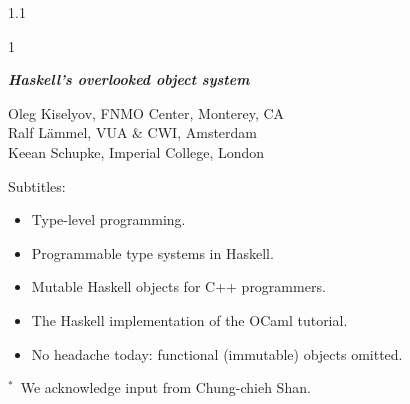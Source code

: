 \documentclass{slides}
\newenvironment{myslide}{\begin{slide}\color{Blue}\begin{boxedminipage}{1.1\hsize}\begin{boxedminipage}{1\hsize}\color{Black}
\vspace{-170\in}
}{%
\smallskip
\end{boxedminipage}
\end{boxedminipage}
\end{slide}}
\newenvironment{myslide}{\begin{slide}
}{%
\end{slide}}
\newenvironment{myslide}{\begin{slide}\color{White}\begin{boxedminipage}{1.1\hsize}\color{Black}
\vspace{-170\in}
}{%
\smallskip
\end{boxedminipage}
\end{slide}}
\newcommand{\noskip}{\topsep1pt \parskip1pt \partopsep1pt}
\newcommand{\header}[1]{{\large \color{Red} #1}}
\newcommand{\blau}[1]{{\vspace{-50\in}\normalsize \color{Blue} #1}}
\begin{document}
\pagestyle{empty}



\begin{comment}
\begin{slide}
 
Press PgDn to start.
 
\end{slide}
\end{comment}






\begin{myslide}

\bigskip

\begin{center}
\header{{\itshape\textbf{Haskell's overlooked object system}}}
\end{center}

\bigskip

{\small

\blau{

Oleg Kiselyov, FNMO Center, Monterey, CA\\
Ralf L{\"a}mmel, VUA \& CWI, Amsterdam\\
Keean Schupke, Imperial College, London

}


\bigskip

Subtitles:

{\noskip\begin{itemize}
\item Type-level programming.
\item Programmable type systems in Haskell.
\item Mutable Haskell objects for C++ programmers.
\item The Haskell implementation of the OCaml tutorial.
\item No headache today: functional (immutable) objects omitted.
\end{itemize}}

\medskip

$^*$\ We acknowledge input from Chung-chieh Shan.

}

\medskip

\end{myslide}



\end{document}
